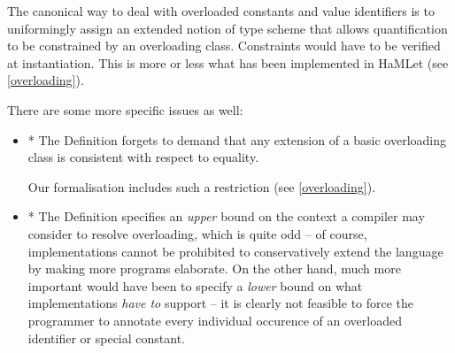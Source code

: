 \documentclass[twoside,titlepage]{article}
\begin{document}
\begin{appendix}
%
%
%
%
%

The canonical way to deal with overloaded constants and value identifiers is to uniformingly assign an extended notion of type scheme that allows quantification to be constrained by an overloading class. Constraints would have to be verified at instantiation. This is more or less what has been implemented in HaMLet (see \ref{overloading}).

There are some more specific issues as well:

\begin{itemize}

\item * The Definition forgets to demand that any extension of a basic overloading class is consistent with respect to equality.

Our formalisation includes such a restriction (see \ref{overloading}).

\item * The Definition specifies an {\em upper} bound on the context a compiler may consider to resolve overloading, which is quite odd -- of course, implementations cannot be prohibited to conservatively extend the language by making more programs elaborate. On the other hand, much more important would have been to specify a {\em lower} bound on what implementations {\em have to} support -- it is clearly not feasible to force the programmer to annotate every individual occurence of an overloaded identifier or special constant.


\end{itemize}
\end{appendix}
\end{document}
